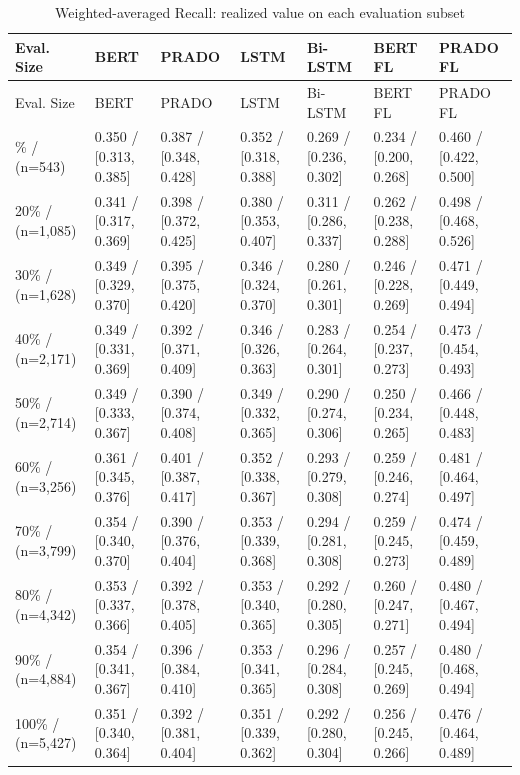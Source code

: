 \begin{longtable}{|p{1.9cm}|p{1.9cm}|p{1.9cm}|p{1.9cm}|p{1.9cm}|p{1.9cm}|p{1.9cm}|}
\caption{Weighted-averaged Recall: realized value on each evaluation subset}
\label{tab:ch3_t6} \\
\hline
Eval. Size & BERT & PRADO & LSTM & Bi-LSTM & BERT FL & PRADO FL \\
\hline
\endfirsthead
\hline
Eval. Size & BERT & PRADO & LSTM & Bi-LSTM & BERT FL & PRADO FL \\
\hline
\endhead
\hline
\endfoot
10\% / (n=543) & 0.350 / {[0.313, 0.385]} & 0.387 / {[0.348, 0.428]} & 0.352 / {[0.318, 0.388]} & 0.269 / {[0.236, 0.302]} & 0.234 / {[0.200, 0.268]} & 0.460 / {[0.422, 0.500]} \\
\hline
20\% / (n=1,085) & 0.341 / {[0.317, 0.369]} & 0.398 / {[0.372, 0.425]} & 0.380 / {[0.353, 0.407]} & 0.311 / {[0.286, 0.337]} & 0.262 / {[0.238, 0.288]} & 0.498 / {[0.468, 0.526]} \\
\hline
30\% / (n=1,628) & 0.349 / {[0.329, 0.370]} & 0.395 / {[0.375, 0.420]} & 0.346 / {[0.324, 0.370]} & 0.280 / {[0.261, 0.301]} & 0.246 / {[0.228, 0.269]} & 0.471 / {[0.449, 0.494]} \\
\hline
40\% / (n=2,171) & 0.349 / {[0.331, 0.369]} & 0.392 / {[0.371, 0.409]} & 0.346 / {[0.326, 0.363]} & 0.283 / {[0.264, 0.301]} & 0.254 / {[0.237, 0.273]} & 0.473 / {[0.454, 0.493]} \\
\hline
50\% / (n=2,714) & 0.349 / {[0.333, 0.367]} & 0.390 / {[0.374, 0.408]} & 0.349 / {[0.332, 0.365]} & 0.290 / {[0.274, 0.306]} & 0.250 / {[0.234, 0.265]} & 0.466 / {[0.448, 0.483]} \\
\hline
60\% / (n=3,256) & 0.361 / {[0.345, 0.376]} & 0.401 / {[0.387, 0.417]} & 0.352 / {[0.338, 0.367]} & 0.293 / {[0.279, 0.308]} & 0.259 / {[0.246, 0.274]} & 0.481 / {[0.464, 0.497]} \\
\hline
70\% / (n=3,799) & 0.354 / {[0.340, 0.370]} & 0.390 / {[0.376, 0.404]} & 0.353 / {[0.339, 0.368]} & 0.294 / {[0.281, 0.308]} & 0.259 / {[0.245, 0.273]} & 0.474 / {[0.459, 0.489]} \\
\hline
80\% / (n=4,342) & 0.353 / {[0.337, 0.366]} & 0.392 / {[0.378, 0.405]} & 0.353 / {[0.340, 0.365]} & 0.292 / {[0.280, 0.305]} & 0.260 / {[0.247, 0.271]} & 0.480 / {[0.467, 0.494]} \\
\hline
90\% / (n=4,884) & 0.354 / {[0.341, 0.367]} & 0.396 / {[0.384, 0.410]} & 0.353 / {[0.341, 0.365]} & 0.296 / {[0.284, 0.308]} & 0.257 / {[0.245, 0.269]} & 0.480 / {[0.468, 0.494]} \\
\hline
100\% / (n=5,427) & 0.351 / {[0.340, 0.364]} & 0.392 / {[0.381, 0.404]} & 0.351 / {[0.339, 0.362]} & 0.292 / {[0.280, 0.304]} & 0.256 / {[0.245, 0.266]} & 0.476 / {[0.464, 0.489]} \\
\hline
\end{longtable}

